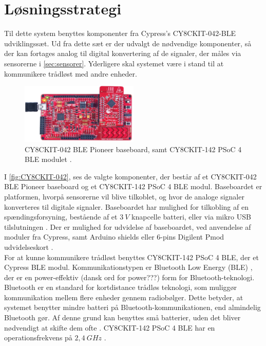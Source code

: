 \section{Løsningsstrategi}
Til dette system benyttes komponenter fra Cypress's CY8CKIT-042-BLE udviklingssæt. 
Ud fra dette sæt er der udvalgt de nødvendige komponenter, så der kan fortages analog til digital konvertering af de signaler, der måles via sensorerne i \autoref{sec:sensorer}. Yderligere skal systemet være i stand til at kommunikere trådløst med andre enheder.   

\begin{figure}[H]
\centering
\includegraphics[width=0.5\textwidth]{figures/CY8CKIT-042.png}
\caption{CY8CKIT-042 BLE Pioneer baseboard, samt CY8CKIT-142 PSoC 4 BLE modulet \citep{cypresspsoc2015}.}
\label{fig:CY8CKIT-042}
\end{figure}

I \autoref{fig:CY8CKIT-042}, ses de valgte komponenter, der består af et CY8CKIT-042 BLE Pioneer baseboard og et CY8CKIT-142 PSoC 4 BLE modul. Baseboardet er platformen, hvorpå sensorerne vil blive tilkoblet, og hvor de analoge signaler konverteres til digitale signaler. Baseboardet har mulighed for tilkobling af en spændingsforsyning, bestående af et $3~V$ knapcelle batteri, eller via mikro USB tilslutningen \citep{cypressguide2014}. Der er mulighed for udvidelse af baseboardet, ved anvendelse af moduler fra Cypress, samt Arduino shields eller 6-pins Digilent Pmod udvidelseskort \citep{cypressguide2014}. 
\\

For at kunne kommunikere trådløst benyttes CY8CKIT-142 PSoC 4 BLE, der et Cypress BLE modul. Kommunikationstypen er Bluetooth Low Energy (BLE) \citep{cypressguide2014}, der er en power-effektiv (dansk ord for power???) form for Bluetooth-teknologi. Bluetooth er en standard for kortdistance trådløs teknologi, som muliggør kommunikation mellem flere enheder gennem radiobølger. Dette betyder, at systemet benytter mindre batteri på Bluetooth-kommunikationen, end almindelig Bluetooth gør. Af denne grund kan benyttes små batterier, uden det bliver nødvendigt at skifte dem ofte \citep{gupta2013}. 
CY8CKIT-142 PSoC 4 BLE har en operationsfrekvens på $2,4~GHz$ \citep{cypressguide2014}. 
\\

